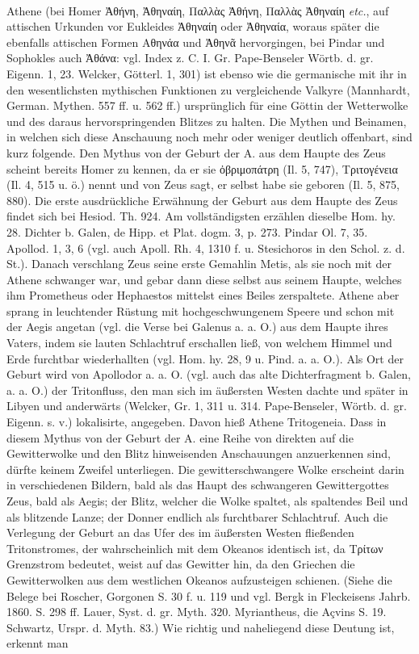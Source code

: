 \documentclass[a4paper, 11pt, oneside]{article}
\begin{document}
\paragraph{}
Athene (bei Homer Ἀθήνη, Ἀθηναίη, Παλλὰς Ἀθήνη, Παλλὰς Ἀθηναίη \emph{etc.}, auf attischen Urkunden vor Eukleides Ἀθηναίη oder Ἀθηναία, woraus später die ebenfalls attischen Formen Αθηνάα und Ἀθηνᾶ hervorgingen, bei Pindar und Sophokles auch Ἀθάνα: vgl. Index z. C. I. Gr. Pape-Benseler Wörtb. d. gr. Eigenn. 1, 23. Welcker, Götterl. 1, 301) ist ebenso wie die germanische mit ihr in den wesentlichsten mythischen Funktionen zu vergleichende Valkyre (Mannhardt, German. Mythen. 557 ff. u. 562 ff.) ursprünglich für eine Göttin der Wetterwolke und des daraus hervorspringenden Blitzes zu halten. Die Mythen und Beinamen, in welchen sich diese Anschauung noch mehr oder weniger deutlich offenbart, sind kurz folgende. Den Mythus von der Geburt der A. aus dem Haupte des Zeus scheint bereits Homer zu kennen, da er sie ὀβριμοπάτρη (Il. 5, 747), Τριτογένεια (Il. 4, 515 u. ö.) nennt und von Zeus sagt, er selbst habe sie geboren (Il. 5, 875, 880). Die erste ausdrückliche Erwähnung der Geburt aus dem Haupte des Zeus findet sich bei Hesiod. Th. 924. Am vollständigsten erzählen dieselbe Hom. hy. 28. Dichter b. Galen, de Hipp. et Plat. dogm. 3, p. 273. Pindar Ol. 7, 35. Apollod. 1, 3, 6 (vgl. auch Apoll. Rh. 4, 1310 f. u. Stesichoros in den Schol. z. d. St.). Danach verschlang Zeus seine erste Gemahlin Metis, als sie noch mit der Athene schwanger war, und gebar dann diese selbst aus seinem Haupte, welches ihm Prometheus oder Hephaestos mittelst eines Beiles zerspaltete. Athene aber sprang in leuchtender Rüstung mit hochgeschwungenem Speere und schon mit der Aegis angetan (vgl. die Verse bei Galenus a. a. O.) aus dem Haupte ihres Vaters, indem sie lauten Schlachtruf erschallen ließ, von welchem Himmel und Erde furchtbar wiederhallten (vgl. Hom. hy. 28, 9 u. Pind. a. a. O.). Als Ort der Geburt wird von Apollodor a. a. O. (vgl. auch das alte Dichterfragment b. Galen, a. a. O.) der Tritonfluss, den man sich im äußersten Westen dachte und später in Libyen und anderwärts (Welcker, Gr. 1, 311 u. 314. Pape-Benseler, Wörtb. d. gr. Eigenn. s. v.) lokalisirte, angegeben. Davon hieß Athene Tritogeneia. Dass in diesem Mythus von der Geburt der A. eine Reihe von direkten auf die Gewitterwolke und den Blitz hinweisenden Anschauungen anzuerkennen sind, dürfte keinem Zweifel unterliegen. Die gewitterschwangere Wolke erscheint darin in verschiedenen Bildern, bald als das Haupt des schwangeren Gewittergottes Zeus, bald als Aegis; der Blitz, welcher die Wolke spaltet, als spaltendes Beil und als blitzende Lanze; der Donner endlich als furchtbarer Schlachtruf. Auch die Verlegung der Geburt an das Ufer des im äußersten Westen fließenden Tritonstromes, der wahrscheinlich mit dem Okeanos identisch ist, da Τρίτων Grenzstrom bedeutet, weist auf das Gewitter hin, da den Griechen die Gewitterwolken aus dem westlichen Okeanos aufzusteigen schienen. (Siehe die Belege bei Roscher, Gorgonen S. 30 f. u. 119 und vgl. Bergk in Fleckeisens Jahrb. 1860. S. 298 ff. Lauer, Syst. d. gr. Myth. 320. Myriantheus, die Açvins S. 19. Schwartz, Urspr. d. Myth. 83.) Wie richtig und naheliegend diese Deutung ist, erkennt man 
\end{document}
